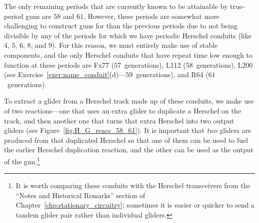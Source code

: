 The only remaining periods that are currently known to be attainable by true-period guns are $58$ and $61$. However, these periods are somewhat more challenging to construct guns for than the previous periods due to not being divisible by any of the periods for which we have periodic Herschel conduits (like $4$, $5$, $6$, $8$, and $9$). For this reason, we must entirely make use of stable components, and the only Herschel conduits that have repeat time low enough to function at these periods are Fx77 ($57$~generations), L112 ($58$~generations), L200 (see Exercise~\ref{exer:name_conduit}(d)---$59$~generations), and R64 ($61$~generations).

To extract a glider from a Herschel track made up of these conduits, we make use of two reactions---one that uses an extra glider to duplicate a Herschel on the track, and then another one that turns that extra Herschel into two output gliders (see Figure~\ref{fig:H_G_reacs_58_61}). It is important that \emph{two} gliders are produced from that duplicated Herschel so that one of them can be used to fuel the earlier Herschel duplication reaction, and the other can be used as the output of the gun.\footnote{It is worth comparing these conduits with the Herschel transceivers from the ``Notes and Historical Remarks'' section of Chapter~\ref{chp:stationary_circuitry}; sometimes it is easier or quicker to send a tandem glider pair rather than individual gliders.}

